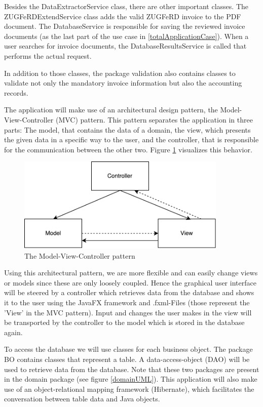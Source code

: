 Besides the DataExtractorService class, there are other important classes. The ZUGFeRDExtendService class adds the valid ZUGFeRD invoice to the PDF document. The DatabaseService is responsible for saving the reviewed invoice documents (as the last part of the use case in \ref{totalApplicationCase}). When a user searches for invoice documents, the DatabaseResultsService is called that performs the actual request.

In addition to those classes, the package validation also contains classes to validate not only the mandatory invoice information but also the accounting records.

The application will make use of an architectural design pattern, the Model-View-Controller (MVC) pattern.
This pattern separates the application in three parts: The model, that contains the data of a domain, the view, which presents the given data in a specific way to the user, and the controller, that is responsible for the communication between the other two. Figure \ref{MVCpattern} visualizes this behavior.

\begin{figure}[ht!]
\centering
\includegraphics[width=100mm,natwidth=141,natheight=64]{Images/UML/MVC.pdf}
\caption{The Model-View-Controller pattern \label{MVCpattern}}
\end{figure}

Using this architectural pattern, we are more flexible and can easily change views or models since these are only loosely coupled. Hence the graphical user interface will be steered by a controller which retrieves data from the database and shows it to the user using the JavaFX framework and .fxml-Files (those represent the 'View' in the MVC pattern). Input and changes the user makes in the view will be transported by the controller to the model which is stored in the database again.

To access the database we will use classes for each business object. The package BO contains classes that represent a table. A data-access-object (DAO) will be used to retrieve data from the database. Note that these two packages are present in the domain package (see figure \ref{domainUML}).
This application will also make use of an object-relational mapping framework (Hibernate), which facilitates the conversation between table data and Java objects.

